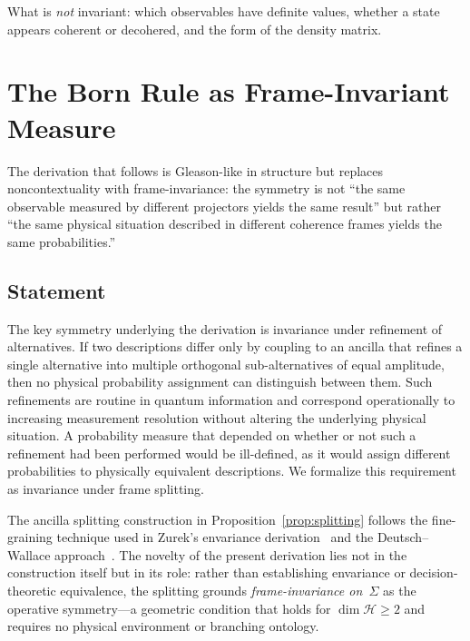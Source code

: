 \documentclass[aps,prd,twocolumn,superscriptaddress,nofootinbib,floatfix]{revtex4-2}
\newcommand{\Sig}{\Sigma}
\begin{document}
What is \emph{not} invariant: which observables have definite values, whether a state appears coherent or decohered, and the form of the density matrix.


\section{The Born Rule as Frame-Invariant Measure}\label{sec:born}

The derivation that follows is Gleason-like in structure but replaces noncontextuality with frame-invariance: the symmetry is not ``the same observable measured by different projectors yields the same result'' but rather ``the same physical situation described in different coherence frames yields the same probabilities.''

\subsection{Statement}

The key symmetry underlying the derivation is invariance under refinement of alternatives. If two descriptions differ only by coupling to an ancilla that refines a single alternative into multiple orthogonal sub-alternatives of equal amplitude, then no physical probability assignment can distinguish between them. Such refinements are routine in quantum information and correspond operationally to increasing measurement resolution without altering the underlying physical situation. A probability measure that depended on whether or not such a refinement had been performed would be ill-defined, as it would assign different probabilities to physically equivalent descriptions. We formalize this requirement as invariance under frame splitting.

The ancilla splitting construction in Proposition~\ref{prop:splitting} follows the fine-graining technique used in Zurek's envariance derivation~\cite{zurekProbabilitiesEntanglementBorns2005} and the Deutsch--Wallace approach~\cite{deutschQuantumTheoryProbability1999,wallaceEmergentMultiverseQuantum2012}. The novelty of the present derivation lies not in the construction itself but in its role: rather than establishing envariance or decision-theoretic equivalence, the splitting grounds \emph{frame-invariance on~$\Sig$} as the operative symmetry---a geometric condition that holds for $\dim\mathcal{H} \geq 2$ and requires no physical environment or branching ontology.
\end{document}
